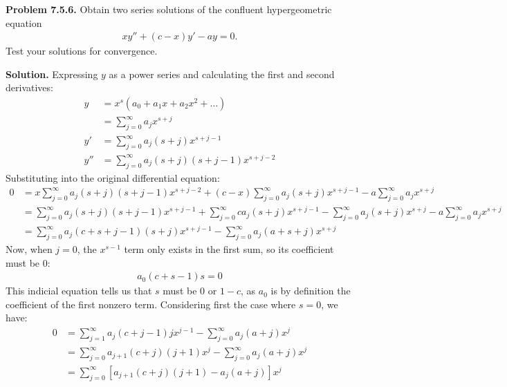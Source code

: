 \documentclass{article}
\begin{document}
\insertTitle

\textbf{Problem 7.5.6.} Obtain two series solutions of the confluent hypergeometric equation
\begin{equation*}
\begin{aligned}
	xy'' + (c-x)y' - ay = 0.
\end{aligned}
\end{equation*}
Test your solutions for convergence.

\textbf{Solution.} Expressing $y$ as a power series and calculating the first and second derivatives:
\begin{equation*}
\begin{aligned}
	y &= x^s(a_0 + a_1 x + a_2 x^2 + \dots ) \\
	  &= \sum_{j=0}^\infty a_j x^{s+j} \\
	y' &= \sum_{j=0}^\infty a_j(s+j)  x^{s+j-1}\\
	y'' &= \sum_{j=0}^\infty a_j(s+j)(s+j-1) x^{s+j-2}
\end{aligned}
\end{equation*}
Substituting into the original differential equation:
\begin{equation*}
\begin{aligned}
	0 &= x\sum_{j=0}^\infty a_j(s+j)(s+j-1) x^{s+j-2} + (c-x)\sum_{j=0}^\infty a_j(s+j)  x^{s+j-1} - a\sum_{j=0}^\infty a_j x^{s+j} \\
	&= \sum_{j=0}^\infty a_j(s+j)(s+j-1) x^{s+j-1} + \sum_{j=0}^\infty c a_j(s+j)  x^{s+j-1} - \sum_{j=0}^\infty a_j(s+j)  x^{s+j} - a\sum_{j=0}^\infty a_j x^{s+j} \\
	&= \sum_{j=0}^\infty a_j(c+s+j-1)(s+j)x^{s+j-1} - \sum_{j=0}^\infty a_j(a+s+j)x^{s+j} 
\end{aligned}
\end{equation*}
Now, when $j=0$, the $x^{s-1}$ term only exists in the first sum, so its coefficient must be 0:
\begin{equation*}
\begin{aligned}
	a_0(c+s-1)s = 0
\end{aligned}
\end{equation*}
This indicial equation tells us that $s$ must be $0$ or $1-c$, as $a_0$ is by definition the coefficient of the first nonzero term. Considering first the case where $s=0$, we have:
\begin{equation*}
\begin{aligned}
	0 &= \sum_{j=1}^\infty a_j(c+j-1)jx^{j-1} - \sum_{j=0}^\infty a_j(a+j)x^{j} \\
	&= \sum_{j=0}^\infty a_{j+1}(c+j)(j+1)x^{j} - \sum_{j=0}^\infty a_j(a+j)x^{j} \\
	&= \sum_{j=0}^\infty \left[a_{j+1}(c+j)(j+1)-a_j(a+j)\right]x^j
\end{aligned}
\end{equation*}
\end{document}
